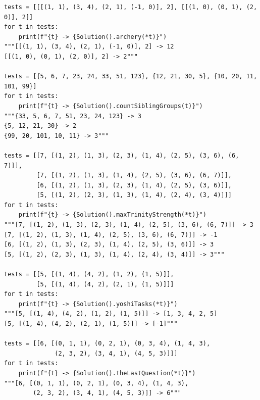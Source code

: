 \documentclass[12pt]{article}
\begin{document}
\begin{verbatim}
tests = [[[(1, 1), (3, 4), (2, 1), (-1, 0)], 2], [[(1, 0), (0, 1), (2, 0)], 2]]
for t in tests:
    print(f"{t} -> {Solution().archery(*t)}")
"""[[(1, 1), (3, 4), (2, 1), (-1, 0)], 2] -> 12
[[(1, 0), (0, 1), (2, 0)], 2] -> 2"""

tests = [{5, 6, 7, 23, 24, 33, 51, 123}, {12, 21, 30, 5}, {10, 20, 11, 101, 99}]
for t in tests:
    print(f"{t} -> {Solution().countSiblingGroups(t)}")
"""{33, 5, 6, 7, 51, 23, 24, 123} -> 3
{5, 12, 21, 30} -> 2
{99, 20, 101, 10, 11} -> 3"""

tests = [[7, [(1, 2), (1, 3), (2, 3), (1, 4), (2, 5), (3, 6), (6, 7)]],
         [7, [(1, 2), (1, 3), (1, 4), (2, 5), (3, 6), (6, 7)]],
         [6, [(1, 2), (1, 3), (2, 3), (1, 4), (2, 5), (3, 6)]],
         [5, [(1, 2), (2, 3), (1, 3), (1, 4), (2, 4), (3, 4)]]]
for t in tests:
    print(f"{t} -> {Solution().maxTrinityStrength(*t)}")
"""[7, [(1, 2), (1, 3), (2, 3), (1, 4), (2, 5), (3, 6), (6, 7)]] -> 3
[7, [(1, 2), (1, 3), (1, 4), (2, 5), (3, 6), (6, 7)]] -> -1
[6, [(1, 2), (1, 3), (2, 3), (1, 4), (2, 5), (3, 6)]] -> 3
[5, [(1, 2), (2, 3), (1, 3), (1, 4), (2, 4), (3, 4)]] -> 3"""

tests = [[5, [(1, 4), (4, 2), (1, 2), (1, 5)]],
         [5, [(1, 4), (4, 2), (2, 1), (1, 5)]]]
for t in tests:
    print(f"{t} -> {Solution().yoshiTasks(*t)}")
"""[5, [(1, 4), (4, 2), (1, 2), (1, 5)]] -> [1, 3, 4, 2, 5]
[5, [(1, 4), (4, 2), (2, 1), (1, 5)]] -> [-1]"""

tests = [[6, [(0, 1, 1), (0, 2, 1), (0, 3, 4), (1, 4, 3),
              (2, 3, 2), (3, 4, 1), (4, 5, 3)]]]
for t in tests:
    print(f"{t} -> {Solution().theLastQuestion(*t)}")
"""[6, [(0, 1, 1), (0, 2, 1), (0, 3, 4), (1, 4, 3),
        (2, 3, 2), (3, 4, 1), (4, 5, 3)]] -> 6"""
\end{verbatim}
\end{document}
